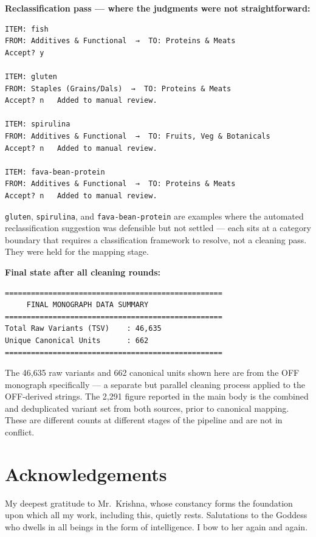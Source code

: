 \documentclass[
  letterpaper,
  DIV=11,
  numbers=noendperiod]{scrartcl}
\begin{document}
\textbf{Reclassification pass --- where the judgments were not
straightforward:}

\begin{verbatim}
ITEM: fish
FROM: Additives & Functional  →  TO: Proteins & Meats
Accept? y 

ITEM: gluten
FROM: Staples (Grains/Dals)  →  TO: Proteins & Meats
Accept? n   Added to manual review.

ITEM: spirulina
FROM: Additives & Functional  →  TO: Fruits, Veg & Botanicals
Accept? n   Added to manual review.

ITEM: fava-bean-protein
FROM: Additives & Functional  →  TO: Proteins & Meats
Accept? n   Added to manual review.
\end{verbatim}

\texttt{gluten}, \texttt{spirulina}, and \texttt{fava-bean-protein} are
examples where the automated reclassification suggestion was defensible
but not settled --- each sits at a category boundary that requires a
classification framework to resolve, not a cleaning pass. They were held
for the mapping stage.

\textbf{Final state after all cleaning rounds:}

\begin{verbatim}
==================================================
     FINAL MONOGRAPH DATA SUMMARY
==================================================
Total Raw Variants (TSV)    : 46,635
Unique Canonical Units      : 662
==================================================
\end{verbatim}

The 46,635 raw variants and 662 canonical units shown here are from the
OFF monograph specifically --- a separate but parallel cleaning process
applied to the OFF-derived strings. The 2,291 figure reported in the
main body is the combined and deduplicated variant set from both
sources, prior to canonical mapping. These are different counts at
different stages of the pipeline and are not in conflict.

\section*{Acknowledgements}\label{acknowledgements}

My deepest gratitude to Mr.~Krishna, whose constancy forms the
foundation upon which all my work, including this, quietly rests.
Salutations to the Goddess who dwells in all beings in the form of
intelligence. I bow to her again and again.
\end{document}

